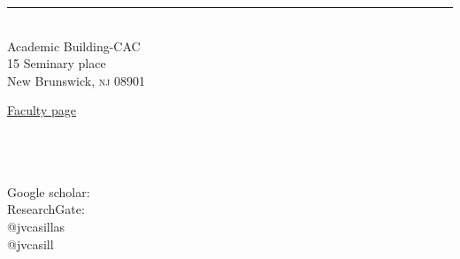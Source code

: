 
\noindent \rule{492pt}{.8 mm}

\begin{minipage}[t]{2.4in}
 \flushleft 
  \href{\schoolweb}{\school} \\ 
  Academic Building-CAC \\  
  15 Seminary place \\
  New Brunswick, \textsc{nj} 08901 
\end{minipage}
\hfill     
\begin{minipage}[t]{1.7in}
  \flushleft 
  \faUniversity \phantom{-}\href{\facweb}{Faculty page} \\
  \faPhone \phantom{-}\myphone \\
  \faPaperPlane \phantom{-}\href{\myemail}{\texttt{\myemail}} \\
  \faHome \phantom{-}\href{https://www.jvcasillas.com}{\texttt{\myweb}} \\
\end{minipage}
\hfill
\begin{minipage}[t]{1.7in}
  \flushright 
  Google scholar: \href{www.google.com}{\aiGoogleScholar} \\ 
  ResearchGate: \href{www.researchgate.com}{\aiResearchGate} \\
  @jvcasillas \href{www.github.com/jvcasillas}{\faGithub} \\ 
  @jvcasill \href{www.twitter.com/jvcasill}{\faTwitter}
\end{minipage}

\vspace{0.1in}
